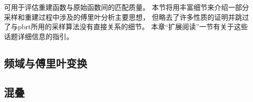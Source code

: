 可用于评估重建函数与原始函数间的匹配质量。
本节将用丰富细节来介绍一部分采样和重建过程中涉及的傅里叶分析主要思想，
但略去了许多性质的证明并跳过了与pbrt所用的采样算法没有直接关系的细节。
本章“扩展阅读”一节有关于这些话题详细信息的指引。

\subsection{频域与傅里叶变换}\label{sub:频域与傅里叶变换}

\subsection{混叠}\label{sub:混叠}